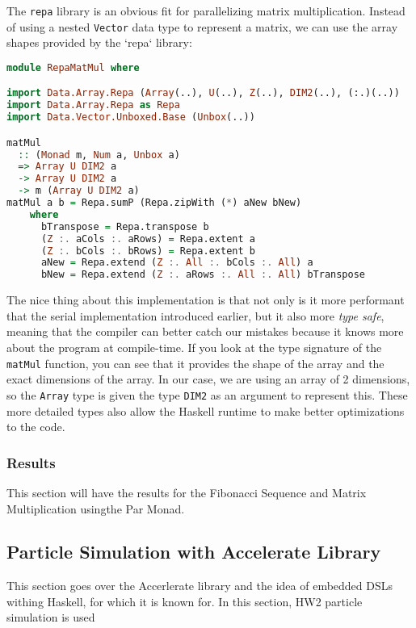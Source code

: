\documentclass[a4paper, 10pt]{article}
\begin{document}
The \lstinline{repa} library is an obvious fit for parallelizing matrix multiplication. Instead of using a nested \lstinline{Vector} data type to represent a matrix, we can use the array shapes provided by the `repa` library:

\begin{lstlisting}[language=Haskell, caption=Matrix multiplication using repa library]
module RepaMatMul where

import Data.Array.Repa (Array(..), U(..), Z(..), DIM2(..), (:.)(..))
import Data.Array.Repa as Repa
import Data.Vector.Unboxed.Base (Unbox(..))

matMul
  :: (Monad m, Num a, Unbox a)
  => Array U DIM2 a
  -> Array U DIM2 a
  -> m (Array U DIM2 a)
matMul a b = Repa.sumP (Repa.zipWith (*) aNew bNew)
    where
      bTranspose = Repa.transpose b
      (Z :. aCols :. aRows) = Repa.extent a
      (Z :. bCols :. bRows) = Repa.extent b
      aNew = Repa.extend (Z :. All :. bCols :. All) a
      bNew = Repa.extend (Z :. aRows :. All :. All) bTranspose
\end{lstlisting}

The nice thing about this implementation is that not only is it more performant that the serial implementation introduced earlier, but it also more \textit{type safe}, meaning that the compiler can better catch our mistakes because it knows more about the program at compile-time. If you look at the type signature of the \lstinline{matMul} function, you can see that it provides the shape of the array and the exact dimensions of the array. In our case, we are using an array of 2 dimensions, so the \lstinline{Array} type is given the type \lstinline{DIM2} as an argument to represent this. These more detailed types also allow the Haskell runtime to make better optimizations to the code.

\subsubsection{Results}
This section will have the results for the Fibonacci Sequence and Matrix Multiplication usingthe Par Monad.

\subsection{Particle Simulation with Accelerate Library}
This section goes over the Accerlerate library and the idea of embedded DSLs withing Haskell, for which it
 is known for. In this section, HW2 particle simulation is used
\end{document}
